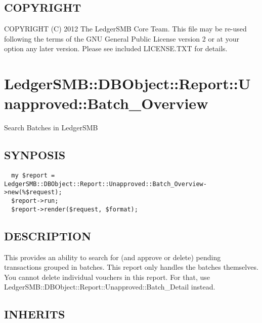 \begin{description}
\begin{description}
\begin{description}
\begin{description}
\begin{description}
\begin{description}
\begin{description}
\begin{description}
\begin{description}
\begin{description}
\subsection*{COPYRIGHT\label{LedgerSMB::DBObject::Report::Unapproved::Batch_Detail_COPYRIGHT}}


COPYRIGHT (C) 2012 The LedgerSMB Core Team.  This file may be re-used following
the terms of the GNU General Public License version 2 or at your option any
later version.  Please see included LICENSE.TXT for details.

\section{LedgerSMB::DBObject::Report::Unapproved::Batch\_Overview\label{LedgerSMB::DBObject::Report::Unapproved::Batch_Overview}}


Search Batches in 
LedgerSMB

\subsection*{SYNPOSIS\label{LedgerSMB::DBObject::Report::Unapproved::Batch_Overview_SYNPOSIS}}
\begin{verbatim}
  my $report = LedgerSMB::DBObject::Report::Unapproved::Batch_Overview->new(%$request);
  $report->run;
  $report->render($request, $format);
\end{verbatim}
\subsection*{DESCRIPTION\label{LedgerSMB::DBObject::Report::Unapproved::Batch_Overview_DESCRIPTION}}


This provides an ability to search for (and approve or delete) pending
transactions grouped in batches.  This report only handles the batches 
themselves.  You cannot delete individual vouchers in this report.  For that,
use LedgerSMB::DBObject::Report::Unapproved::Batch\_Detail instead.

\subsection*{INHERITS\label{LedgerSMB::DBObject::Report::Unapproved::Batch_Overview_INHERITS}}
\begin{description}


\end{description}
\end{description}
\end{description}
\end{description}
\end{description}
\end{description}
\end{description}
\end{description}
\end{description}
\end{description}
\end{description}
